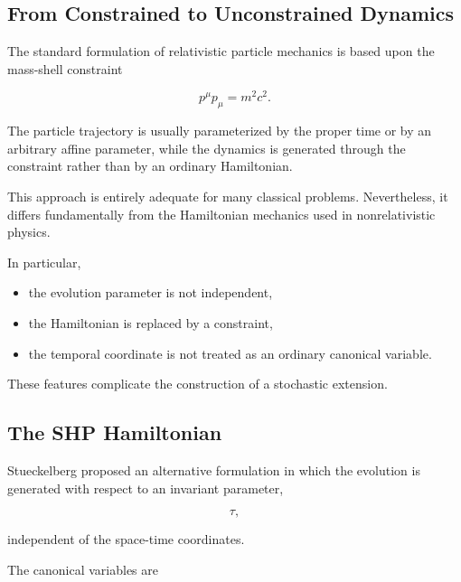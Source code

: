 \subsection{From Constrained to Unconstrained Dynamics}

The standard formulation of relativistic particle mechanics is based upon
the mass-shell constraint

\[
p^\mu p_\mu = m^2c^2.
\]

The particle trajectory is usually parameterized by the proper time or by
an arbitrary affine parameter, while the dynamics is generated through
the constraint rather than by an ordinary Hamiltonian.

This approach is entirely adequate for many classical problems.
Nevertheless, it differs fundamentally from the Hamiltonian mechanics
used in nonrelativistic physics.

In particular,

\begin{itemize}

\item the evolution parameter is not independent,

\item the Hamiltonian is replaced by a constraint,

\item the temporal coordinate is not treated as an ordinary canonical
variable.

\end{itemize}

These features complicate the construction of a stochastic extension.

\subsection{The SHP Hamiltonian}

Stueckelberg proposed an alternative formulation in which the evolution
is generated with respect to an invariant parameter,

\[
\tau,
\]

independent of the space-time coordinates.

The canonical variables are

